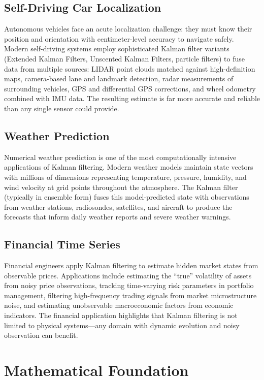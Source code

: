 \subsection{Self-Driving Car Localization}

Autonomous vehicles face an acute localization challenge: they must know their position and orientation with centimeter-level accuracy to navigate safely. Modern self-driving systems employ sophisticated Kalman filter variants (Extended Kalman Filters, Unscented Kalman Filters, particle filters) to fuse data from multiple sources: LIDAR point clouds matched against high-definition maps, camera-based lane and landmark detection, radar measurements of surrounding vehicles, GPS and differential GPS corrections, and wheel odometry combined with IMU data. The resulting estimate is far more accurate and reliable than any single sensor could provide.

\subsection{Weather Prediction}

Numerical weather prediction is one of the most computationally intensive applications of Kalman filtering. Modern weather models maintain state vectors with millions of dimensions representing temperature, pressure, humidity, and wind velocity at grid points throughout the atmosphere. The Kalman filter (typically in ensemble form) fuses this model-predicted state with observations from weather stations, radiosondes, satellites, and aircraft to produce the forecasts that inform daily weather reports and severe weather warnings.

\subsection{Financial Time Series}

Financial engineers apply Kalman filtering to estimate hidden market states from observable prices. Applications include estimating the ``true'' volatility of assets from noisy price observations, tracking time-varying risk parameters in portfolio management, filtering high-frequency trading signals from market microstructure noise, and estimating unobservable macroeconomic factors from economic indicators. The financial application highlights that Kalman filtering is not limited to physical systems---any domain with dynamic evolution and noisy observation can benefit.

\section{Mathematical Foundation}

